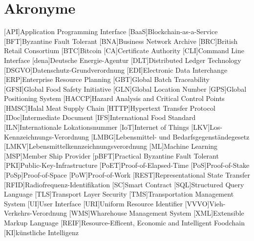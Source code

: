 \section*{Akronyme}            %
\begin{acronym}[HACCP]
  [API]{Application Programming Interface}
	[BaaS]{Blockchain-as-a-Service}
  [BFT]{Byzantine Fault Tolerant}
  [BNA]{Business Network Archive}
  [BRC]{British Retail Consortium}
	[BTC]{Bitcoin}
  [CA]{Certificate Authority}
  [CLI]{Command Line Interface}
	[dena]{Deutsche Energie-Agentur}
	[DLT]{Distributed Ledger Technology}
  [DSGVO]{Datenschutz-Grundverordnung}
  [EDI]{Electronic Data Interchange}
  [ERP]{Enterprise Resource Planning}
  [GBT]{Global Batch Traceability}
  [GFSI]{Global Food Safety Initiative}
  [GLN]{Global Location Number}
  [GPS]{Global Positioning System}
  [HACCP]{Hazard Analysis and Critical Control Points}
  [HMSC]{Halal Meat Supply Chain}
  [HTTP]{Hypertext Transfer Protocol}
  [IDoc]{Intermediate Document}
  [IFS]{International Food Standard}
  [ILN]{Internationale Lokationsnummer}
	[IoT]{Internet of Things}
  [LKV]{Los-Kennzeichnungs-Verordnung}
  [LMBG]{Lebensmittel- und Bedarfsgegenständegesetz}
  [LMKV]{Lebensmittelkennzeichnungsverordnung}
	[ML]{Machine Learning}
  [MSP]{Member Ship Provider}
  [pBFT]{Practical Byzantine Fault Tolerant}
  [PKI]{Public-Key-Infrastructure}
  [PoET]{Proof-of-Elapsed-Time}
  [PoS]{Proof-of-Stake}
  [PoSp]{Proof-of-Space}
	[PoW]{Proof-of-Work}
  [REST]{Representational State Transfer}
  [RFID]{Radiofrequenz-Identifikation}
	[SC]{Smart Contract}
  [SQL]{Structured Query Language}
  [TLS]{Transport Layer Security}
  [TMS]{Transportation Management System}
  [UI]{User Interface}
  [URI]{Uniform Resource Identifier}
  [VVVO]{Vieh-Verkehrs-Verordnung}
  [WMS]{Wharehouse Management System}
  [XML]{Extensible Markup Language}
  [REIF]{Resource-Efficent, Economic and Intelligent Foodchain}
  [KI]{künstliche Intelligenz}
\end{acronym}

\newpage

\listoffigures
{}
\listoftables
{}
\lstlistoflistings
{}
\newpage
